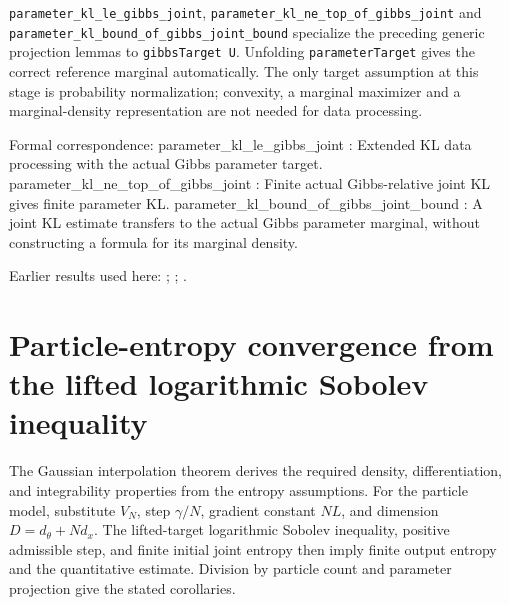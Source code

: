 \documentclass[11pt,a4paper]{report}
\newlength{\leancharwidth}
\newenvironment{leancode}{\par\smallskip\begingroup\ttfamily\footnotesize\raggedright
  \settowidth{\leancharwidth}{M}\setlength{\parskip}{0pt}\setlength{\parindent}{0pt}
  \frenchspacing}{\par\endgroup\smallskip}
\newcommand{\leanlabel}[1]{\par\smallskip\noindent{\small\bfseries #1}\par}
\begin{document}
\begin{leanbox}
\begin{leancode}
\end{leancode}
\leanlabel{How the Lean proof follows the argument}
\texttt{parameter\_\allowbreak{}kl\_\allowbreak{}le\_\allowbreak{}gibbs\_\allowbreak{}joint}, \texttt{parameter\_\allowbreak{}kl\_\allowbreak{}ne\_\allowbreak{}top\_\allowbreak{}of\_\allowbreak{}gibbs\_\allowbreak{}joint} and \texttt{parameter\_\allowbreak{}kl\_\allowbreak{}bound\_\allowbreak{}of\_\allowbreak{}gibbs\_\allowbreak{}joint\_\allowbreak{}bound} specialize the preceding generic projection lemmas to \texttt{gibbs\allowbreak{}Target U}. Unfolding \texttt{parameter\allowbreak{}Target} gives the correct reference marginal automatically. The only target assumption at this stage is probability normalization; convexity, a marginal maximizer and a marginal-density representation are not needed for data processing.



Formal correspondence: parameter\_kl\_le\_gibbs\_joint : Extended KL data processing with the actual Gibbs parameter target. parameter\_kl\_ne\_top\_of\_gibbs\_joint : Finite actual Gibbs-relative joint KL gives finite parameter KL. parameter\_kl\_bound\_of\_gibbs\_joint\_bound : A joint KL estimate transfers to the actual Gibbs parameter marginal, without constructing a formula for its marginal density.
\end{leanbox}


Earlier results used here: \cite[Section~3.1.1]{LangevinLean2026IPLA}; \cite[Section~3.1.6]{LangevinLean2026IPLA}; \cite[Section~3.3.2]{LangevinLean2026IPLA}.
\section{\texorpdfstring{Particle-entropy convergence from the lifted logarithmic Sobolev inequality}{Particle-entropy convergence from the lifted logarithmic Sobolev inequality}}
\label{proof-module-IPLA-LSI-UnconditionalTheorem-lean}


The Gaussian interpolation theorem derives the required density, differentiation, and integrability properties from the entropy assumptions. For the particle model, substitute \(V_N\), step \(\gamma/N\), gradient constant \(NL\), and dimension \(D=d_\theta+Nd_x\). The lifted-target logarithmic Sobolev inequality, positive admissible step, and finite initial joint entropy then imply finite output entropy and the quantitative estimate. Division by particle count and parameter projection give the stated corollaries.
\end{document}
